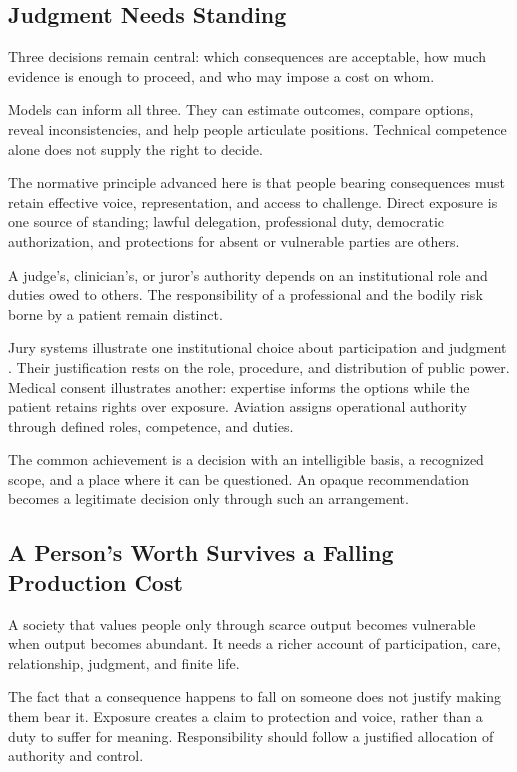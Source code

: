 \documentclass[11pt,openany]{book}
\begin{document}
\subsection{Judgment Needs Standing}

Three decisions remain central: which consequences are acceptable, how much evidence is enough to proceed, and who may impose a cost on whom.

Models can inform all three. They can estimate outcomes, compare options, reveal inconsistencies, and help people articulate positions. Technical competence alone does not supply the right to decide.

The normative principle advanced here is that people bearing consequences must retain effective voice, representation, and access to challenge. Direct exposure is one source of standing; lawful delegation, professional duty, democratic authorization, and protections for absent or vulnerable parties are others.

A judge's, clinician's, or juror's authority depends on an institutional role and duties owed to others. The responsibility of a professional and the bodily risk borne by a patient remain distinct.

Jury systems illustrate one institutional choice about participation and judgment \cite{kalven1966american}. Their justification rests on the role, procedure, and distribution of public power. Medical consent illustrates another: expertise informs the options while the patient retains rights over exposure. Aviation assigns operational authority through defined roles, competence, and duties.

The common achievement is a decision with an intelligible basis, a recognized scope, and a place where it can be questioned. An opaque recommendation becomes a legitimate decision only through such an arrangement.

\subsection{A Person's Worth Survives a Falling Production Cost}

A society that values people only through scarce output becomes vulnerable when output becomes abundant. It needs a richer account of participation, care, relationship, judgment, and finite life.

The fact that a consequence happens to fall on someone does not justify making them bear it. Exposure creates a claim to protection and voice, rather than a duty to suffer for meaning. Responsibility should follow a justified allocation of authority and control.
\end{document}
